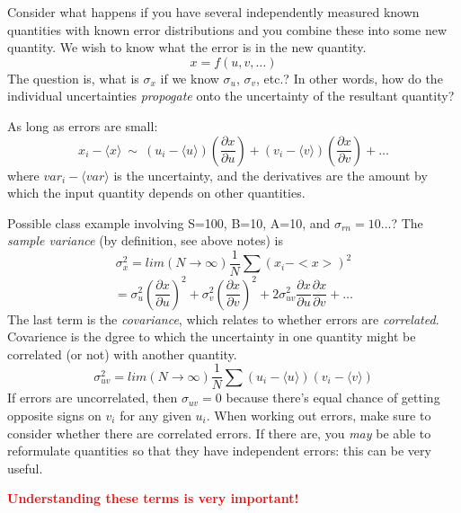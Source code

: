 \documentclass[12pt]{article}
\newcommand{\mynotes}[1]{\textcolor{myBlue}{#1}}
\begin{document}
Consider what happens if you have several independently measured known
quantities with known error distributions and you combine these into some new
quantity. We wish to know what the error is in the new quantity.
\[
    x = f(u, v, \ldots)
    \]
The question is, what is $\sigma_x$ if we know
$\sigma_u$, $\sigma_v$, etc.?
\mynotes{In other words, how do the individual uncertainties
\emph{propogate} onto the uncertainty of the resultant quantity?}

As long as errors are small:
\[
    x_{i} -  \langle x \rangle  \ \sim \
    (u_{i} -  \langle u \rangle )\left(\frac{\partial x}{\partial u}\right)
    + (v_{i} -  \langle v \rangle )\left( \frac{\partial x}{\partial v}  \right)
    + \ldots
    \]
where $var_{i} -  \langle var \rangle $ is the uncertainty, and the derivatives are the
amount by which the input quantity depends on other quantities.

\mynotes{Possible class example involving
S=100, B=10, A=10, and $\sigma_{rn}=10\ldots$?
The \emph{sample variance} (by definition, see above notes) is}
\[
    \sigma_{x}^{2} = lim(N \rightarrow \infty)\frac{1}{N} \sum(x_{i} - <x>)^{2}
    \]
\[
    = \sigma_u^{2}\left(\frac{\partial x}{\partial u}\right)^{2}
    + \sigma_v^{2}\left(\frac{\partial x}{\partial v}\right)^{2}
    + 2\sigma_{uv}^{2}\frac{\partial x}{\partial u}
    \frac{\partial x}{\partial v} + \ldots
    \]
The last term is the \textit{covariance}, which relates to whether errors are
\textit{correlated}.
\mynotes{Covarience is the dgree to which the uncertainty
in one quantity might be correlated (or not) with another quantity}.
\[
    \sigma_{uv}^{2} = lim(N \rightarrow\infty)\frac{1}{N}
    \sum(u_{i} -  \langle u \rangle )(v_{i} -  \langle v \rangle )
    \]
If errors are uncorrelated, then $\sigma_{uv} = 0$ because there's
equal chance of getting opposite signs on $v_{i}$ for any given $u_{i}$.
When working out errors, make sure to consider whether there are
correlated errors. If there are, you \emph{may} be able to reformulate
quantities so that they have independent errors: this can be very
useful.

\textcolor{red}{\textbf{Understanding these terms is very important!}}
\end{document}
